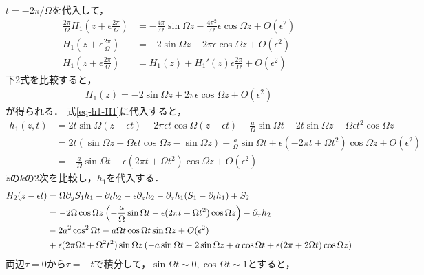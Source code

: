 \documentclass[../main]{subfiles}
\begin{document}
    $t=-2\pi/\Omega$を代入して，
    \begin{align*}
        \frac{2\pi}{\Omega}H_1\left(z+\epsilon\frac{2\pi}{\Omega}\right)&=-\frac{4\pi}{\Omega}\sin\Omega z-\frac{4\pi^2}{\Omega}\epsilon \cos \Omega z+O(\epsilon^2)\\
        H_1\left(z+\epsilon\frac{2\pi}{\Omega}\right)&=-2 \sin\Omega z-2\pi\epsilon \cos \Omega z+O(\epsilon^2)\\
        H_1\left(z+\epsilon\frac{2\pi}{\Omega}\right)&=H_1(z)+H_1'(z)\epsilon\frac{2\pi}{\Omega}+O(\epsilon^2)
    \end{align*}
    下2式を比較すると，
    \begin{align*}
        H_1(z)=-2\sin\Omega z+2\pi\epsilon \cos\Omega z+O(\epsilon^2)
    \end{align*}
    が得られる．
    式\eqref{eq-h1-H1}に代入すると，
    \begin{align*}
        h_1(z,t)&=2t\sin\Omega(z-\epsilon t)-2\pi\epsilon t\cos\Omega(z-\epsilon t)-\frac{a}{\Omega}\sin\Omega t-2t\sin \Omega z+\Omega\epsilon t^2\cos \Omega z\\
        &=2t(\sin\Omega z-\Omega \epsilon t\cos\Omega z-\sin\Omega z)-\frac{a}{\Omega}\sin\Omega t+\epsilon(-2\pi t+\Omega t^2)\cos \Omega z+O(\epsilon^2)\\
        &=-\frac{a}{\Omega}\sin\Omega t-\epsilon(2\pi t+\Omega t^2)\cos \Omega z+O(\epsilon^2)
    \end{align*}
    $\dot{z}のk$の2次を比較し，$h_1$を代入する．
    \begin{align*}
        H_2(z-\epsilon t)&=\Omega \partial_y S_1h_1 -\partial_th_2-\epsilon\partial_zh_2 -\partial_zh_1(S_1-\partial_th_1)+S_2\\
        &=-2\Omega \cos \Omega z\left( -\frac{a}{\Omega}\sin\Omega t-\epsilon(2\pi t+\Omega t^2) \cos \Omega z \right)-\partial_\tau h_2\\
        &-2a^2\cos^2\Omega t-a\Omega t\cos \Omega t\sin \Omega z+O(\epsilon^2)\\
        &+\epsilon(2\pi\Omega t+\Omega^2 t^2)\sin\Omega z \left( -a\sin\Omega t-2\sin\Omega z +a\cos\Omega t+\epsilon(2\pi +2\Omega t)\cos\Omega z\right)
    \end{align*}
    両辺$\tau=0$から$\tau=-t$で積分して，$\sin\Omega t\sim 0,\cos\Omega t\sim 1$とすると，
\end{document}
